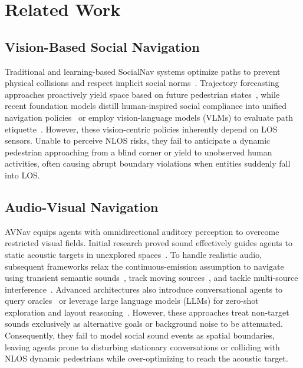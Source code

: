 \section{Related Work}
\label{sec:related}

\subsection{Vision-Based Social Navigation}
Traditional and learning-based SocialNav systems optimize paths to prevent physical collisions and respect implicit social norms~\cite{PrinciplesGuidelinesEvaluating2025}. Trajectory forecasting approaches proactively yield space based on future pedestrian states~\cite{CognitionPrecognitionFutureaware2025}, while recent foundation models distill human-inspired social compliance into unified navigation policies~\cite{SocialNavTrainingHumanInspired2026} or employ vision-language models (VLMs) to evaluate path etiquette~\cite{VLMsocialnavSociallyAware2025, ObstaclesEtiquetteRobot2026}. However, these vision-centric policies inherently depend on LOS sensors. Unable to perceive NLOS risks, they fail to anticipate a dynamic pedestrian approaching from a blind corner or yield to unobserved human activities, often causing abrupt boundary violations when entities suddenly fall into LOS.

\subsection{Audio-Visual Navigation}
AVNav equips agents with omnidirectional auditory perception to overcome restricted visual fields. Initial research proved sound effectively guides agents to static acoustic targets in unexplored spaces~\cite{LookListenAct2020, LearningSetWaypoints2021}. To handle realistic audio, subsequent frameworks relax the continuous-emission assumption to navigate using transient semantic sounds~\cite{SemanticAudiovisualNavigation2021}, track moving sources~\cite{CatchMeIf2023}, and tackle multi-source interference~\cite{AudiovisualNavigationNoisy2025}. Advanced architectures also introduce conversational agents to query oracles~\cite{AVLENAudiovisuallanguageEmbodied2022, CAVENEmbodiedConversational2024} or leverage large language models (LLMs) for zero-shot exploration and layout reasoning~\cite{RILAReflectiveImaginative2024}. However, these approaches treat non-target sounds exclusively as alternative goals or background noise to be attenuated. Consequently, they fail to model social sound events as spatial boundaries, leaving agents prone to disturbing stationary conversations or colliding with NLOS dynamic pedestrians while over-optimizing to reach the acoustic target.

